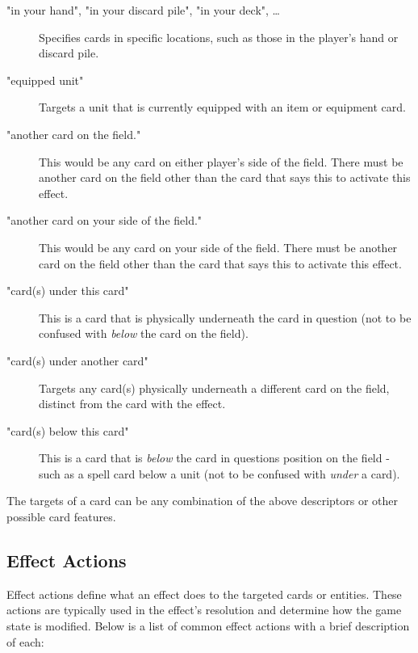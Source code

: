 \begin{description}
	\item["in your hand", "in your discard pile", "in your deck", \dots] Specifies cards in specific locations, such as those in the player's hand or discard pile.
	\item["equipped unit"] Targets a unit that is currently equipped with an item or equipment card.
	\item["another card on the field."] This would be any card on either player's side of the field. There must be another card on the field other than the card that says this to activate this effect.
	\item["another card on your side of the field."] This would be any card on your side of the field. There must be another card on the field other than the card that says this to activate this effect.
	\item["card(s) under this card"] This is a card that is physically underneath the card in question (not to be confused with \textit{below} the card on the field).
	\item["card(s) under another card"] Targets any card(s) physically underneath a different card on the field, distinct from the card with the effect.
	\item["card(s) below this card"] This is a card that is \textit{below} the card in questions position on the field - such as a spell card below a unit (not to be confused with \textit{under} a card).
\end{description}
The targets of a card can be any combination of the above descriptors or other possible card features.



\subsection{Effect Actions}
Effect actions define what an effect does to the targeted cards or entities. These actions are typically used in the effect’s resolution and determine how the game state is modified. Below is a list of common effect actions with a brief description of each:

